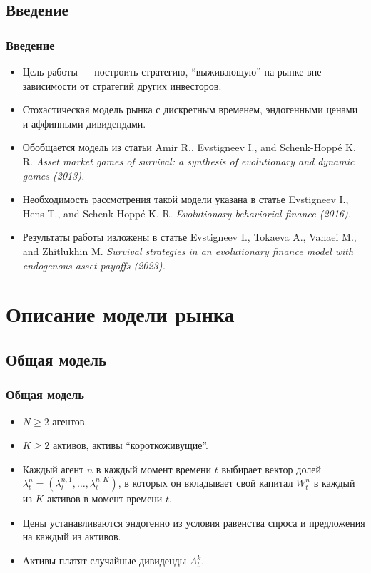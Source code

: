 \documentclass[10pt]{beamer}
\theoremstyle{definition}
\theoremstyle{remark}
\begin{document}
\subsection{Введение}
\begin{frame}\frametitle{Введение} 
    \begin{itemize}

    \item Цель работы — построить стратегию, ``выживающую''  на рынке вне зависимости от стратегий других инвесторов.\\
    \item Стохастическая модель рынка с дискретным временем, эндогенными ценами и аффинными дивидендами.\\
    \item Обобщается модель из статьи Amir R., Evstigneev I., and Schenk-Hoppé K. R.  {\em Asset market games of survival: a synthesis of evolutionary and dynamic games (2013). }
    \item Необходимость рассмотрения такой модели указана в статье Evstigneev I., Hens T., and Schenk-Hoppé K. R. {\em Evolutionary behaviorial finance (2016).} 
    \item Результаты работы изложены в статье Evstigneev I., Tokaeva A., Vanaei M., and Zhitlukhin M. {\em Survival strategies in an evolutionary finance model with endogenous asset payoffs (2023).}
        
	
    
    
    \end{itemize}
\end{frame}

\section{Описание модели рынка}
\subsection{Общая модель}
\begin{frame}\frametitle{Общая модель} 
     \begin{itemize}
	\item $N \geq 2$ агентов.\\
    \item $K \geq 2$ активов, активы ``короткоживущие''.\\
    \item Каждый агент $n$ в каждый момент времени $t$ выбирает вектор долей $\lambda_t^n = (\lambda_{t}^{n,1},\ldots,\lambda_{t}^{n,K})$, в которых он вкладывает свой капитал $W_t^n$ в каждый из $K$ активов в момент времени $t$.\\
    \item Цены устанавливаются эндогенно из условия равенства спроса и предложения на каждый из активов.
    \item Активы платят случайные дивиденды $A_t^k$.
    \end{itemize}
\end{frame}
\end{document}
